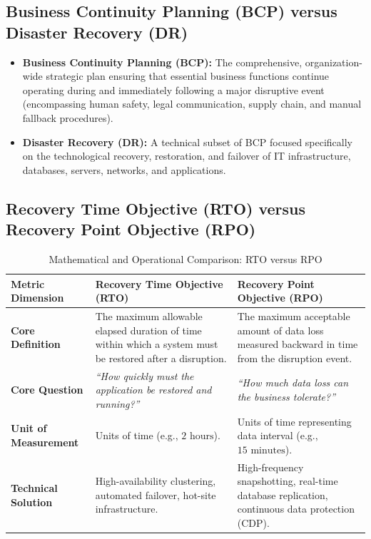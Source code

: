 \subsection{Business Continuity Planning (BCP) versus Disaster Recovery (DR)}

\begin{itemize}
\item \textbf{Business Continuity Planning (BCP):} The comprehensive, organization-wide strategic plan ensuring that essential business functions continue operating during and immediately following a major disruptive event (encompassing human safety, legal communication, supply chain, and manual fallback procedures).
\item \textbf{Disaster Recovery (DR):} A technical subset of BCP focused specifically on the technological recovery, restoration, and failover of IT infrastructure, databases, servers, networks, and applications.
\end{itemize}

\subsection{Recovery Time Objective (RTO) versus Recovery Point Objective (RPO)}

\begin{table}[htbp]
\centering
\caption{Mathematical and Operational Comparison: RTO versus RPO}
\label{tab:rto_vs_rpo}
\begin{tabularx}{\textwidth}{p{3.2cm} X X}
\toprule
\textbf{Metric Dimension} & \textbf{Recovery Time Objective (RTO)} & \textbf{Recovery Point Objective (RPO)} \\
\midrule
\textbf{Core Definition} & The maximum allowable elapsed duration of time within which a system must be restored after a disruption. & The maximum acceptable amount of data loss measured backward in time from the disruption event. \\
\textbf{Core Question} & \textit{``How quickly must the application be restored and running?''} & \textit{``How much data loss can the business tolerate?''} \\
\textbf{Unit of Measurement} & Units of time (e.g., $2\text{ hours}$). & Units of time representing data interval (e.g., $15\text{ minutes}$). \\
\textbf{Technical Solution} & High-availability clustering, automated failover, hot-site infrastructure. & High-frequency snapshotting, real-time database replication, continuous data protection (CDP). \\
\bottomrule
\end{tabularx}
\end{table}

